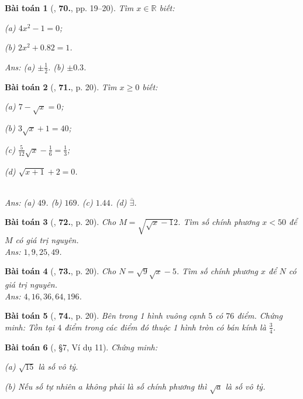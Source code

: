 \documentclass{article}
\numberwithin{equation}{section}
\newtheorem{baitoan}{Bài toán}
\begin{document}
\begin{baitoan}[\cite{Tuyen_Toan_7}, \textbf{70.}, pp. 19--20]
	Tìm $x\in\mathbb{R}$ biết:
	\begin{enumerate*}
		\item[(a)] $4x^2 - 1 = 0$;
		\item[(b)] $2x^2 + 0.82 = 1$.
	\end{enumerate*}\hfill{\sf Ans:} (a) $\pm\frac{1}{2}$. (b) $\pm0.3$.
\end{baitoan}

\begin{baitoan}[\cite{Tuyen_Toan_7}, \textbf{71.}, p. 20]
	Tìm $x\ge 0$ biết:
	\begin{enumerate*}
		\item[(a)] $7 - \sqrt{x} = 0$;
		\item[(b)] $3\sqrt{x} + 1 = 40$;
		\item[(c)] $\frac{5}{12}\sqrt{x} - \frac{1}{6} = \frac{1}{3}$;
		\item[(d)] $\sqrt{x + 1} + 2 = 0$.
	\end{enumerate*}\\\mbox{}\hfill{\sf Ans:} (a) $49$. (b) $169$. (c) $1.44$. (d) $\overline{\exists}$.
\end{baitoan}

\begin{baitoan}[\cite{Tuyen_Toan_7}, \textbf{72.}, p. 20]
	Cho $M = \sqrt{\sqrt{x} - 1}{2}$. Tìm số chính phương $x < 50$ để $M$ có giá trị nguyên.\\\mbox{}\hfill{\sf Ans:} $1,9,25,49$.
\end{baitoan}

\begin{baitoan}[\cite{Tuyen_Toan_7}, \textbf{73.}, p. 20]
	Cho $N = \sqrt{9}{\sqrt{x} - 5}$. Tìm số chính phương $x$ để $N$ có giá trị nguyên.\\\mbox{}\hfill{\sf Ans:} $4,16,36,64,196$.
\end{baitoan}

\begin{baitoan}[\cite{Tuyen_Toan_7}, \textbf{74.}, p. 20]
	Bên trong 1 hình vuông cạnh $5$ có $76$ điểm. Chứng minh: Tồn tại $4$ điểm trong các điểm đó thuộc 1 hình tròn có bán kính là $\frac{3}{4}$.
\end{baitoan}

\begin{baitoan}[\cite{Binh_Toan_7_tap_1}, \S7, Ví dụ 11]
	Chứng minh:
	\begin{enumerate*}
		\item[(a)] $\sqrt{15}$ là số vô tỷ.
		\item[(b)] Nếu số tự nhiên $a$ không phải là số chính phương thì $\sqrt{a}$ là số vô tỷ.
	\end{enumerate*}
\end{baitoan}
\end{document}
